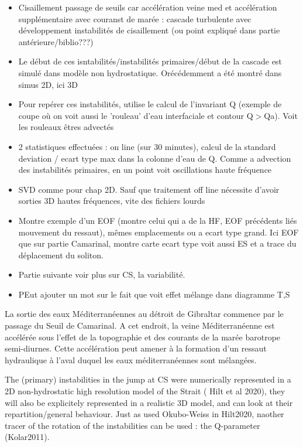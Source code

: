 \begin{itemize}
\item Cisaillement passage de seuils car accélération veine med et accélération supplémentaire avec couranst de marée : cascade turbulente avec développement instabilités de cisaillement (ou point expliqué dans partie antérieure/biblio???)
\item Le début de ces isntabilités/instabilités primaires/début de la cascade est simulé dans modèle non hydrostatique. Orécédemment a été montré dans simus 2D, ici 3D
\item Pour repérer ces instabilités, utilise le calcul de l'invariant Q (exemple de coupe où on voit aussi le 'rouleau' d'eau interfaciale et contour Q$>$Qa). Voit les rouleaux êtres advectés
\item 2 statistiques effectuées : on line (sur 30 minutes), calcul de la standard deviation / ecart type max dans la colonne d'eau de Q. Comme a advection des instabilités primaires, en un point voit oscillations haute fréquence
\item SVD comme pour chap 2D. Sauf que traitement off line nécessite d'avoir sorties 3D hautes fréquences, vite des fichiers lourds
\item Montre exemple d'un EOF (montre celui qui a de la HF, EOF précédents liés mouvement du ressaut), mêmes emplacements ou a ecart type grand. Ici EOF que sur partie Camarinal, montre carte ecart type voit aussi ES et a trace du déplacement du soliton.
\item Partie suivante voir plus sur CS, la variabilité.
\item PEut ajouter un mot sur le fait que voit effet mélange dans diagramme T,S
\end{itemize}

La sortie des eaux Méditerranéennes au détroit de Gibraltar commence par le passage du Seuil de Camarinal. A cet endroit, la veine Méditerranéenne est accélérée sous l'effet de la topographie et des courants de la marée barotrope semi-diurnes. Cette accélération peut amener à la formation d'un ressaut hydraulique à l'aval duquel les eaux méditerranéennes sont mélangées. 

The (primary) instabilities in the jump at CS were numerically represented in a 2D non-hydrostatic high resolution model of the Strait ( Hilt et al 2020), they will also be explicitely represented in a realistic 3D model, and can look at their repartition/general behaviour. Just as used Okubo-Weiss in Hilt2020, naother tracer of the rotation of the instabilities can be used : the Q-parameter (Kolar2011).

